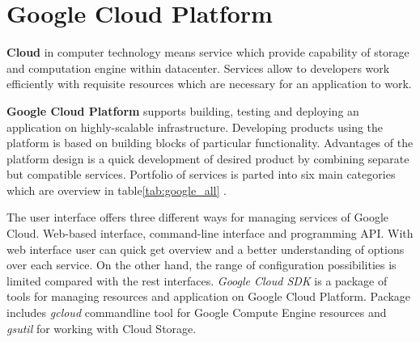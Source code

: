 \documentclass[a4paper,12pt,oneside]{report}
\begin{document}
	
	
	
	\section{Google Cloud Platform}
	\textbf{Cloud} in computer technology means service which provide capability of
	storage and computation engine within datacenter. Services allow to developers 
	work efficiently  with 
	requisite resources which are necessary for an application to work.
	
	\textbf{Google Cloud Platform} supports building, testing and deploying an
	application on highly-scalable infrastructure.
	Developing products using the platform is based on building blocks of particular
	functionality. Advantages of  the platform design is a quick development of 
	desired product by combining separate but compatible services. Portfolio of
	services is parted into six main categories 
	which are overview  in
	table\ref{tab:google_all} \cite{gc_product_services}.
	
	The user interface offers three different ways for managing services of Google
	Cloud. Web-based interface, command-line 
	interface and programming API. With web interface 
	user can quick get overview and a better understanding of 
	options over each service. On the other hand, the range of configuration
	possibilities is limited compared with the rest 
	interfaces. \textit{Google Cloud SDK} is a 
	package of tools for managing resources and application on Google Cloud
	Platform. 
	Package includes \textit{gcloud} commandline tool for Google Compute Engine
	resources and \textit{gsutil} for working with Cloud Storage.
	
\end{document}
